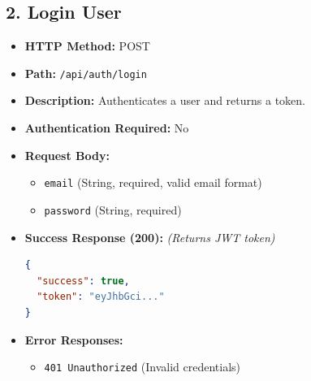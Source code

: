 \documentclass[12pt,a4paper]{article}
\begin{document}
\subsection{2. Login User}
\begin{itemize}
    \item \textbf{HTTP Method:} POST
    \item \textbf{Path:} \texttt{/api/auth/login}
    \item \textbf{Description:} Authenticates a user and returns a token.
    \item \textbf{Authentication Required:} No
    \item \textbf{Request Body:}
    \begin{itemize}
        \item \texttt{email} (String, required, valid email format)
        \item \texttt{password} (String, required)
    \end{itemize}
    \item \textbf{Success Response (200):} \textit{(Returns JWT token)}
\begin{lstlisting}[language=json]
{
  "success": true,
  "token": "eyJhbGci..."
}
\end{lstlisting}
    \item \textbf{Error Responses:}
    \begin{itemize}
        \item \texttt{401 Unauthorized} (Invalid credentials)
    \end{itemize}
\end{itemize}
\end{document}
